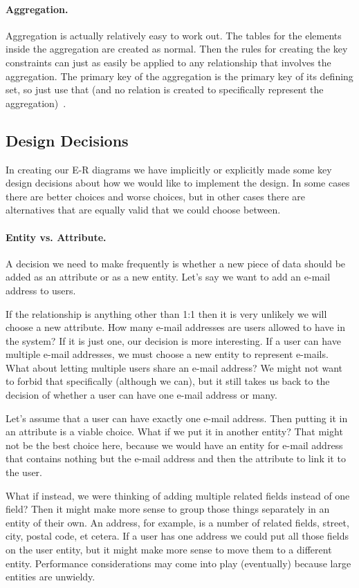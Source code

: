 \paragraph{Aggregation.} Aggregation is actually relatively easy to work out. The tables for the elements inside the aggregation are created as normal. Then the rules for creating the key constraints can just as easily be applied to any relationship that involves the aggregation. The primary key of the aggregation is the primary key of its defining set, so just use that (and no relation is created to specifically represent the aggregation)~\cite{dsc}.

\subsection*{Design Decisions}

In creating our E-R diagrams we have implicitly or explicitly made some key design decisions about how we would like to implement the design. In some cases there are better choices and worse choices, but in other cases there are alternatives that are equally valid that we could choose between.

\paragraph{Entity vs. Attribute.} A decision we need to make frequently is whether a new piece of data should be added as an attribute or as a new entity. Let's say we want to add an e-mail address to users.

If the relationship is anything other than 1:1 then it is very unlikely we will choose a new attribute. How many e-mail addresses are users allowed to have in the system? If it is just one, our decision is more interesting. If a user can have multiple e-mail addresses, we must choose a new entity to represent e-mails. What about letting multiple users share an e-mail address? We might not want to forbid that specifically (although we can), but it still takes us back to the decision of whether a user can have one e-mail address or many.

Let's assume that a user can have exactly one e-mail address. Then putting it in an attribute is a viable choice. What if we put it in another entity? That might not be the best choice here, because we would have an entity for e-mail address that contains nothing but the e-mail address and then the attribute to link it to the user. 

What if instead, we were thinking of adding multiple related fields instead of one field? Then it might make more sense to group those things separately in an entity of their own. An address, for example, is a number of related fields, street, city, postal code, et cetera. If a user has one address we could put all those fields on the user entity, but it might make more sense to move them to a different entity. Performance considerations may come into play (eventually) because large entities are unwieldy. 

